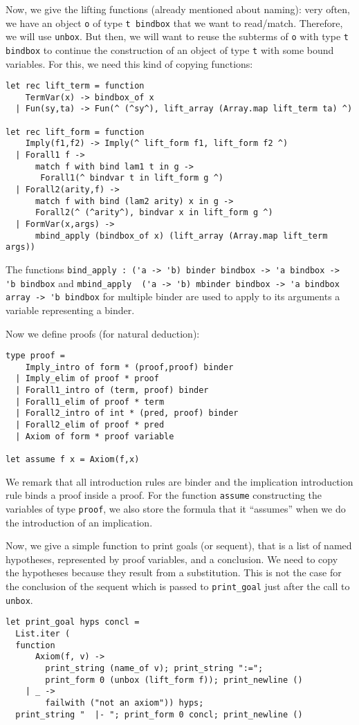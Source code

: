 \documentclass[11pt]{article}
\begin{document}
Now, we give the lifting functions (already mentioned about naming): very often, we have
an object \verb#o# of type \verb#t bindbox# that we want to
read/match. Therefore, we will use \verb#unbox#.
But then, we will want to reuse the subterms of \verb#o# with
type  \verb#t bindbox# to continue the construction of an object of
type \verb#t# with some bound variables. For this, we need this kind
of copying functions:

\begin{verbatim}
let rec lift_term = function
    TermVar(x) -> bindbox_of x
  | Fun(sy,ta) -> Fun(^ (^sy^), lift_array (Array.map lift_term ta) ^)

let rec lift_form = function
    Imply(f1,f2) -> Imply(^ lift_form f1, lift_form f2 ^)
  | Forall1 f ->
      match f with bind lam1 t in g ->
       Forall1(^ bindvar t in lift_form g ^)
  | Forall2(arity,f) ->
      match f with bind (lam2 arity) x in g ->
      Forall2(^ (^arity^), bindvar x in lift_form g ^)
  | FormVar(x,args) ->
      mbind_apply (bindbox_of x) (lift_array (Array.map lift_term args))
\end{verbatim}

The functions
\verb#bind_apply : ('a -> 'b) binder bindbox -> 'a bindbox -> 'b bindbox# and
\verb#mbind_apply  ('a -> 'b) mbinder bindbox -> 'a bindbox array -> 'b bindbox#
for multiple binder are
used to apply to its arguments a variable representing a binder.

Now we define proofs (for natural deduction):
\begin{verbatim}
type proof =
    Imply_intro of form * (proof,proof) binder
  | Imply_elim of proof * proof
  | Forall1_intro of (term, proof) binder
  | Forall1_elim of proof * term
  | Forall2_intro of int * (pred, proof) binder
  | Forall2_elim of proof * pred
  | Axiom of form * proof variable

let assume f x = Axiom(f,x)
\end{verbatim}

We remark that all introduction rules are binder and the
implication introduction rule binds a proof inside a proof.
For the function \verb#assume# constructing the variables of type
\verb#proof#, we also store the formula that it ``assumes'' when we do
the introduction of an implication.

Now, we give a simple function to print goals (or sequent), that is a
list of named hypotheses, represented by proof variables, and a
conclusion. We need to copy the hypotheses because they result from a
substitution. This is not the case for the conclusion of the sequent
which is passed to \verb#print_goal# just after the call to \verb#unbox#.
\begin{verbatim}
let print_goal hyps concl =
  List.iter (
  function
      Axiom(f, v) ->
        print_string (name_of v); print_string ":=";
        print_form 0 (unbox (lift_form f)); print_newline ()
    | _ ->
        failwith ("not an axiom")) hyps;
  print_string "  |- "; print_form 0 concl; print_newline ()
\end{verbatim}
\end{document}
